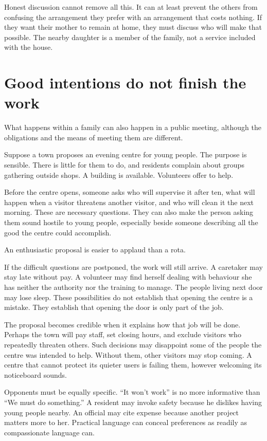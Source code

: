 \documentclass[12pt,a4paper]{book}
\begin{document}
Honest discussion cannot remove all this. It can at least prevent the others from confusing the arrangement they prefer with an arrangement that costs nothing. If they want their mother to remain at home, they must discuss who will make that possible. The nearby daughter is a member of the family, not a service included with the house.

\section*{Good intentions do not finish the work}

What happens within a family can also happen in a public meeting, although the obligations and the means of meeting them are different.

Suppose a town proposes an evening centre for young people. The purpose is sensible. There is little for them to do, and residents complain about groups gathering outside shops. A building is available. Volunteers offer to help.

Before the centre opens, someone asks who will supervise it after ten, what will happen when a visitor threatens another visitor, and who will clean it the next morning. These are necessary questions. They can also make the person asking them sound hostile to young people, especially beside someone describing all the good the centre could accomplish.

An enthusiastic proposal is easier to applaud than a rota.

If the difficult questions are postponed, the work will still arrive. A caretaker may stay late without pay. A volunteer may find herself dealing with behaviour she has neither the authority nor the training to manage. The people living next door may lose sleep. These possibilities do not establish that opening the centre is a mistake. They establish that opening the door is only part of the job.

The proposal becomes credible when it explains how that job will be done. Perhaps the town will pay staff, set closing hours, and exclude visitors who repeatedly threaten others. Such decisions may disappoint some of the people the centre was intended to help. Without them, other visitors may stop coming. A centre that cannot protect its quieter users is failing them, however welcoming its noticeboard sounds.

Opponents must be equally specific. ``It won't work'' is no more informative than ``We must do something.'' A resident may invoke safety because he dislikes having young people nearby. An official may cite expense because another project matters more to her. Practical language can conceal preferences as readily as compassionate language can.
\end{document}
